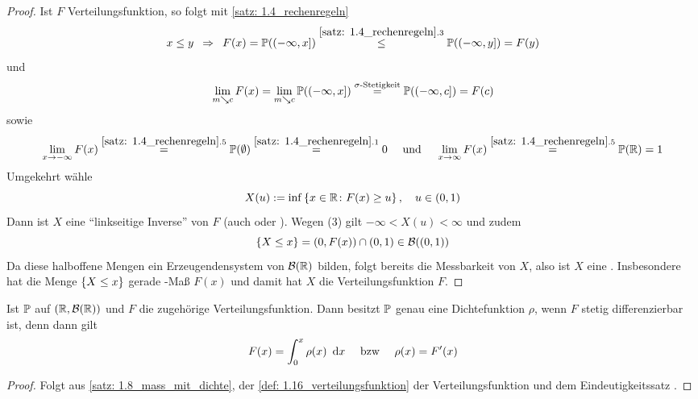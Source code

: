 \begin{proof}
    Ist $F$ Verteilungsfunktion, so folgt mit \ref{satz: 1.4_rechenregeln}
    \begin{equation*}
        x \leq y \follows F(x) = \P((-\infty,x]) \overset{\ref{satz: 1.4_rechenregeln}.3}{\leq} \P((-\infty,y]) = F(y)
    \end{equation*}
    und
    \begin{equation*}
        \lim_{m \searrow c} F(x) = \lim_{m \searrow c} \P((-\infty, x]) \overset{\sigma\text{-Stetigkeit}}{=} \P((-\infty, c]) = F(c)
    \end{equation*}
    sowie
    \begin{equation*}
        \lim_{x\to -\infty} F(x) \overset{\ref{satz: 1.4_rechenregeln}.5}{=} \P(\emptyset) \overset{\ref{satz: 1.4_rechenregeln}.1}{=} 0 \quad \und \quad
        \lim_{x\to \infty} F(x) \overset{\ref{satz: 1.4_rechenregeln}.5}{=} \P(\R) = 1
    \end{equation*}
    Umgekehrt wähle
    \begin{equation*}
        X(u) \defeq \inf \menge{x \in \R \colon F(x) \geq u}, \quad u \in (0,1)\\
    \end{equation*}
    Dann ist $X$ eine ``linkseitige Inverse'' von $F$ (auch  oder ).
    Wegen (3) gilt $-\infty < X(u) < \infty$ und zudem
    \begin{equation*}
        \menge{X \leq x} = (0, F(x)) \cap (0,1) \in \borel{(0,1)}
    \end{equation*}
    Da diese halboffene Mengen ein Erzeugendensystem von $\borel\R$ bilden, folgt bereits die Messbarkeit von $X$, also ist $X$ eine \ZV. Insbesondere hat die Menge $\menge{X \le x}$ gerade -Maß $F(x)$ und damit hat $X$ die Verteilungsfunktion $F$.
\end{proof}

\begin{korollar}
    Ist $\P$ \WMass auf $(\R, \borel\R)$ und $F$ die zugehörige Verteilungsfunktion. Dann besitzt $\P$ genau eine Dichtefunktion $\rho$, wenn $F$ stetig differenzierbar ist, denn dann gilt
    \begin{equation*}
        F(x) = \int_{0}^{x} \rho(x) \dx \quad \text{ bzw } \quad \rho(x) = F'(x)
    \end{equation*}
\end{korollar}

\begin{proof}
    Folgt aus \cref{satz: 1.8_mass_mit_dichte}, der \cref{def: 1.16_verteilungsfunktion} der Verteilungsfunktion und dem Eindeutigkeitssatz .
\end{proof}